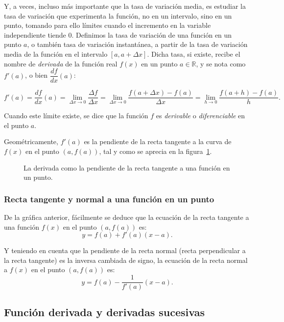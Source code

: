 Y, a veces, incluso más importante que la tasa de variación media,
es estudiar la tasa de variación que experimenta la función, no en
un intervalo, sino en un punto, tomando para ello límites cuando el
incremento en la variable independiente tiende 0. Definimos la tasa
de variación de una función en un punto $a$, o también tasa de
variación instantánea, a partir de la tasa de variación media de la
función en el intervalo $[a,a+\Delta x]$. Dicha tasa, si existe,
recibe el nombre de \emph{derivada} de la función real $f(x)$ en un
punto $a\in \mathbb{R}$, y se nota como $f'(a)$, o bien
$\dfrac{df}{dx}(a)$:

\[
f'(a)=\dfrac{df}{dx}(a)= \lim_{\Delta x\rightarrow 0}\frac{\Delta
f}{\Delta x}=\lim_{\Delta x\rightarrow 0}\frac{f(a+\Delta
x)-f(a)}{\Delta x}=\lim_{h\rightarrow 0}\frac{f(a+h)-f(a)}{h}.
\]

Cuando este límite existe, se dice que la función $f$ es
\emph{derivable} o \emph{diferenciable} en el punto $a$.

Geométricamente, $f'(a)$ es la pendiente de la recta tangente a la
curva de $f(x)$ en el punto $(a,f(a))$, tal y como se aprecia en la
figura~\ref{g:tangente}.

\begin{figure}[h!]
\begin{center}
\scalebox{1}{}
\caption{La derivada como la pendiente de la recta tangente a una
función en un punto.} \label{g:tangente}
\end{center}
\end{figure}

\subsubsection*{Recta tangente y normal a una función en un punto}
De la gráfica anterior, fácilmente se deduce que la ecuación de la
recta tangente a una función $f(x)$ en el punto $(a,f(a))$ es:
\[
y=f(a)+f'(a)(x-a).
\]

Y teniendo en cuenta que la pendiente de la recta normal (recta
perpendicular a la recta tangente) es la inversa cambiada de signo,
la ecuación de la recta normal a $f(x)$ en el punto $(a,f(a))$ es:
\[
y=f(a)-\frac{1}{f'(a)}(x-a).
\]

\subsection{Función derivada y derivadas sucesivas}

